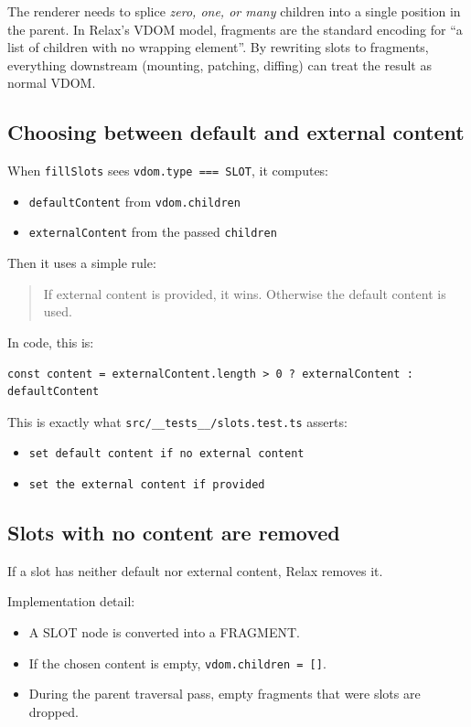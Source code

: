 The renderer needs to splice \emph{zero, one, or many} children into a single position in the parent.
In Relax’s VDOM model, fragments are the standard encoding for ``a list of children with no wrapping element''.
By rewriting slots to fragments, everything downstream (mounting, patching, diffing) can treat the result as normal VDOM.

\subsection{Choosing between default and external content}

When \texttt{fillSlots} sees \texttt{vdom.type === SLOT}, it computes:

\begin{itemize}
  \item \texttt{defaultContent} from \texttt{vdom.children}
  \item \texttt{externalContent} from the passed \texttt{children}
\end{itemize}

Then it uses a simple rule:

\begin{quote}
If external content is provided, it wins. Otherwise the default content is used.
\end{quote}

In code, this is:

\begin{verbatim}
const content = externalContent.length > 0 ? externalContent : defaultContent
\end{verbatim}

This is exactly what \texttt{src/\_\_tests\_\_/slots.test.ts} asserts:

\begin{itemize}
  \item \texttt{set default content if no external content}
  \item \texttt{set the external content if provided}
\end{itemize}

\subsection{Slots with no content are removed}

If a slot has neither default nor external content, Relax removes it.

Implementation detail:

\begin{itemize}
  \item A SLOT node is converted into a FRAGMENT.
  \item If the chosen content is empty, \texttt{vdom.children = []}.
  \item During the parent traversal pass, empty fragments that were slots are dropped.
\end{itemize}

